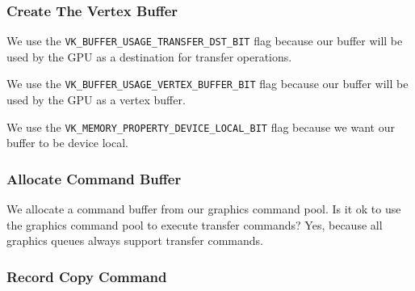 \begin{minipage}{\linewidth}{\noindent}
    
\end{minipage}

\subsubsection{Create The Vertex Buffer}

We use the \texttt{VK\_BUFFER\_USAGE\_TRANSFER\_DST\_BIT} flag
because our buffer will be used by the GPU as a destination for
transfer operations.

We use the \texttt{VK\_BUFFER\_USAGE\_VERTEX\_BUFFER\_BIT} flag
because our buffer will be used by the GPU as a vertex buffer.

We use the \texttt{VK\_MEMORY\_PROPERTY\_DEVICE\_LOCAL\_BIT} flag
because we want our buffer to be device local.

\begin{minipage}{\linewidth}{\noindent}
    
\end{minipage}

\subsubsection{Allocate Command Buffer}

We allocate a command buffer from our graphics command pool.
Is it ok to use the graphics command pool to execute transfer commands?
Yes, because all graphics queues always support transfer commands.

\begin{minipage}{\linewidth}{\noindent}
    
\end{minipage}

\subsubsection{Record Copy Command}

